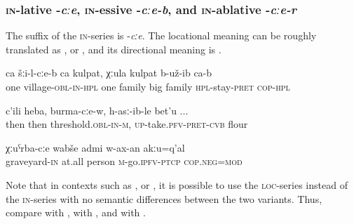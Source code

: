 
\subsubsection{\textsc{in}-lative -\textit{cːe}, \textsc{in}-essive -\textit{cːe-b}, and \textsc{in}-ablative -\textit{cːe-r}}
\label{sssec:in-lative -cːe, in-essive -cːe-b, and in-ablative -cːe-r}

The suffix of the \textsc{in}-series is -\textit{cːe}. The locational meaning can be roughly translated as  , or  , and its directional meaning is  .
%
\begin{exe} 
	\ex	\label{In one village lived a big family}
	\gll	ca	šːi-l-cːe-b	ca	kulpat,	χːula	kulpat	b-už-ib ca-b \\
		one	village-\textsc{obl-in}-\textsc{hpl} one	family	big	family	\textsc{hpl}-stay-\textsc{pret} \textsc{cop-hpl}\\
	\glt	{}
	
		\ex	\label{Then, on the threshold, he took the flour}
	\gll	c'ili heba, burma-cːe-w, h-asː-ib-le bet'u ...\\
		then then threshold.\textsc{obl-in-m}, \textsc{up}-take.\textsc{pfv-pret-cvb} flour\\
	\glt	{}
	
	\ex	\label{No person at all should go to the graveyard}
	\gll	χːuˁrba-cːe	wabše	admi	w-ax-an	akːu=q'al\\
		graveyard-\textsc{in}	at.all	person	\textsc{m}-go.\textsc{ipfv}-\textsc{ptcp}	\textsc{cop.neg}=\textsc{mod}\\
	\glt	{}
\end{exe}

Note that in contexts such as ,  or , it is possible to use the \textsc{loc}-series instead of the \textsc{in}-series with no semantic differences between the two variants. Thus, compare  with ,  with , and  with . 

